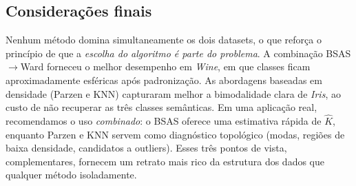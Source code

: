\documentclass[11pt,a4paper]{article}
\begin{document}
\subsection{Considerações finais}
Nenhum método domina simultaneamente os dois datasets, o que reforça o princípio de que a \emph{escolha do algoritmo é parte do problema}.
A combinação BSAS$\to$Ward forneceu o melhor desempenho em \emph{Wine}, em que classes ficam aproximadamente esféricas após padronização. As abordagens baseadas em densidade (Parzen e KNN) capturaram melhor a bimodalidade clara de \emph{Iris}, ao custo de não recuperar as três classes semânticas.
Em uma aplicação real, recomendamos o uso \emph{combinado}: o BSAS oferece uma estimativa rápida de $\hat K$, enquanto Parzen e KNN servem como diagnóstico topológico (modas, regiões de baixa densidade, candidatos a outliers).
Esses três pontos de vista, complementares, fornecem um retrato mais rico da estrutura dos dados que qualquer método isoladamente.
\end{document}
